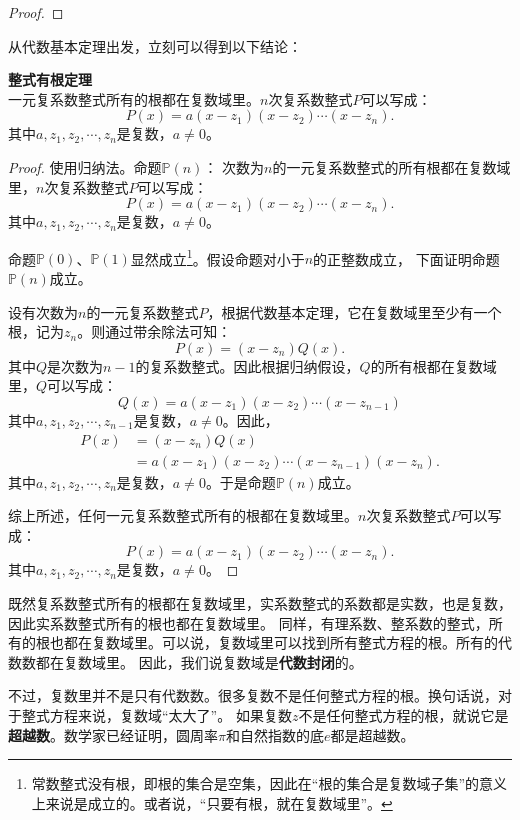 \documentclass[12pt,UTF8,fontset=none]{ctexbook}
\begin{document}
\begin{appendix}
\begin{proof}
\end{proof}

从代数基本定理出发，立刻可以得到以下结论：

\begin{tm}{\textbf{整式有根定理}}
    \mbox{} \\
    \indent 一元复系数整式所有的根都在复数域里。$n$次复系数整式$P$可以写成：
    $$ P(x) = a(x - z_1)(x - z_2)\cdots(x - z_n).$$
    其中$a, z_1, z_2,\cdots, z_n$是复数，$a\neq 0$。   
\end{tm}

\begin{proof}
    使用归纳法。命题$\mathbb{P}(n)$：
    次数为$n$的一元复系数整式的所有根都在复数域里，$n$次复系数整式$P$可以写成：
    $$ P(x) = a(x - z_1)(x - z_2)\cdots(x - z_n).$$
    其中$a, z_1, z_2,\cdots, z_n$是复数，$a\neq 0$。 

    命题$\mathbb{P}(0)$、$\mathbb{P}(1)$显然成立\footnote{常数整式没有根，即根的集合是空集，因此在“根的集合是复数域子集”的意义上来说是成立的。或者说，“只要有根，就在复数域里”。}。假设命题对小于$n$的正整数成立，
    下面证明命题$\mathbb{P}(n)$成立。

    设有次数为$n$的一元复系数整式$P$，根据代数基本定理，它在复数域里至少有一个根，记为$z_n$。则通过带余除法可知：
    $$ P(x) = (x - z_n)Q(x).$$
    其中$Q$是次数为$n-1$的复系数整式。因此根据归纳假设，$Q$的所有根都在复数域里，$Q$可以写成：
    $$ Q(x) = a(x - z_1)(x - z_2)\cdots(x - z_{n-1})$$
    其中$a, z_1, z_2,\cdots, z_{n-1}$是复数，$a\neq 0$。因此，
    \begin{align*} 
        P(x) &= (x - z_n)Q(x) \\
        &= a(x - z_1)(x - z_2)\cdots(x - z_{n-1})(x - z_n).
    \end{align*}
    其中$a, z_1, z_2,\cdots, z_n$是复数，$a\neq 0$。于是命题$\mathbb{P}(n)$成立。

    综上所述，任何一元复系数整式所有的根都在复数域里。$n$次复系数整式$P$可以写成：
    $$ P(x) = a(x - z_1)(x - z_2)\cdots(x - z_n).$$
    其中$a, z_1, z_2,\cdots, z_n$是复数，$a\neq 0$。 

\end{proof}

既然复系数整式所有的根都在复数域里，实系数整式的系数都是实数，也是复数，因此实系数整式所有的根也都在复数域里。
同样，有理系数、整系数的整式，所有的根也都在复数域里。可以说，复数域里可以找到所有整式方程的根。所有的代数数都在复数域里。
因此，我们说复数域是\textbf{代数封闭}的。

不过，复数里并不是只有代数数。很多复数不是任何整式方程的根。换句话说，对于整式方程来说，复数域“太大了”。
如果复数$z$不是任何整式方程的根，就说它是\textbf{超越数}。数学家已经证明，圆周率$\pi$和自然指数的底$e$都是超越数。


\end{appendix}
\end{document}
